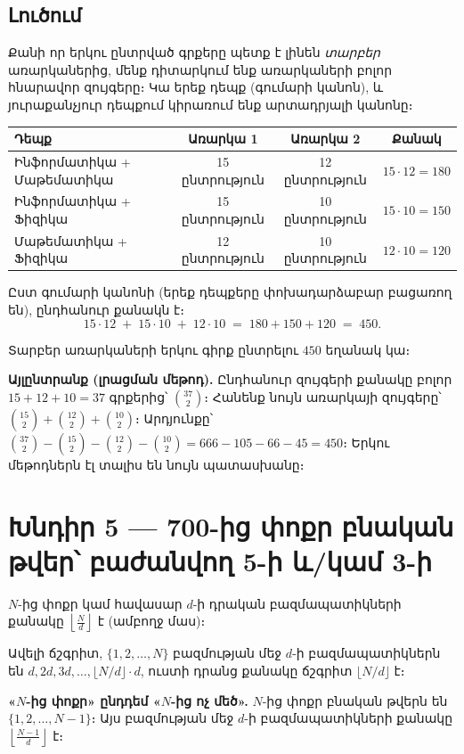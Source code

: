 \documentclass[12pt, a4paper]{article}
\begin{document}
\subsection*{Լուծում}

Քանի որ երկու ընտրված գրքերը պետք է լինեն \emph{տարբեր} առարկաներից,
մենք դիտարկում ենք առարկաների բոլոր հնարավոր զույգերը։
Կա երեք դեպք (գումարի կանոն), և յուրաքանչյուր դեպքում կիրառում ենք
արտադրյալի կանոնը։

\begin{center}
\renewcommand{\arraystretch}{1.4}
\begin{tabular}{lccc}
\toprule
\textbf{Դեպք} & \textbf{Առարկա 1} & \textbf{Առարկա 2} & \textbf{Քանակ} \\
\midrule
Ինֆորմատիկա + Մաթեմատիկա & 15 ընտրություն & 12 ընտրություն & $15 \cdot 12 = 180$ \\
Ինֆորմատիկա + Ֆիզիկա     & 15 ընտրություն & 10 ընտրություն & $15 \cdot 10 = 150$ \\
Մաթեմատիկա + Ֆիզիկա     & 12 ընտրություն & 10 ընտրություն & $12 \cdot 10 = 120$ \\
\bottomrule
\end{tabular}
\end{center}

Ըստ գումարի կանոնի (երեք դեպքերը փոխադարձաբար բացառող են), ընդհանուր քանակն է։
\[
  15 \cdot 12 \;+\; 15 \cdot 10 \;+\; 12 \cdot 10
  \;=\; 180 + 150 + 120
  \;=\; 450.
\]

\begin{answerbox}
\centering
Տարբեր առարկաների երկու գիրք ընտրելու $\boxed{450}$ եղանակ կա։
\end{answerbox}

\textbf{Այլընտրանք (լրացման մեթոդ).}\;
Ընդհանուր զույգերի քանակը բոլոր $15+12+10=37$ գրքերից՝ $\binom{37}{2}$։
Հանենք նույն առարկայի զույգերը՝ $\binom{15}{2} + \binom{12}{2} + \binom{10}{2}$։
Արդյունքը՝ $\binom{37}{2} - \binom{15}{2} - \binom{12}{2} - \binom{10}{2} = 666 - 105 - 66 - 45 = 450$։\newline
Երկու մեթոդներն էլ տալիս են նույն պատասխանը։ \checkmark

\newpage
\section{Խնդիր 5 — 700-ից փոքր բնական թվեր՝ բաժանվող 5-ի և/կամ 3-ի}

\begin{theorybox}
$N$-ից փոքր կամ հավասար $d$-ի դրական բազմապատիկների քանակը
$\left\lfloor \frac{N}{d} \right\rfloor$ է (ամբողջ մաս)։

Ավելի ճշգրիտ, $\{1, 2, \ldots, N\}$ բազմության մեջ $d$-ի բազմապատիկներն են
$d, 2d, 3d, \ldots, \lfloor N/d \rfloor \cdot d$,
ուստի դրանց քանակը ճշգրիտ $\lfloor N/d \rfloor$ է։

\medskip
\textbf{«$N$-ից փոքր» ընդդեմ «$N$-ից ոչ մեծ».}\;
$N$-ից փոքր բնական թվերն են $\{1, 2, \ldots, N-1\}$։
Այս բազմության մեջ $d$-ի բազմապատիկների քանակը
$\left\lfloor \frac{N-1}{d} \right\rfloor$ է։
\end{theorybox}
\end{document}
